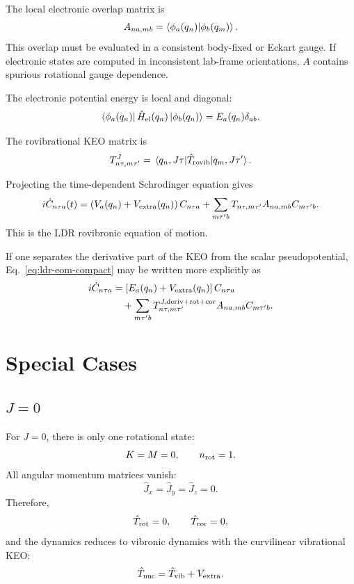 \documentclass[11pt]{revtex4-2}
\begin{document}
The local electronic overlap matrix is
\begin{equation}
  A_{n a, m b}
  =
  \braket{\phi_a(q_n)}{\phi_b(q_m)} .
  \label{eq:electronic-overlap}
\end{equation}
This overlap must be evaluated in a consistent body-fixed or Eckart gauge.
If electronic states are computed in inconsistent lab-frame orientations,
$A$ contains spurious rotational gauge dependence.

The electronic potential energy is local and diagonal:
\begin{equation}
  \bra{\phi_a(q_n)}
  \hat{H}_{\rm el}(q_n)
  \ket{\phi_b(q_n)}
  =
  E_a(q_n)\delta_{ab}.
\end{equation}

The rovibrational KEO matrix is
\begin{equation}
  T^J_{n\tau,m\tau'}
  =
  \mel{q_n,J\tau}
  {\hat{T}_{\rm rovib}}
  {q_m,J\tau'} .
  \label{eq:tj-matrix}
\end{equation}

Projecting the time-dependent Schrodinger equation gives
\begin{equation}
  i\dot{C}_{n\tau a}(t)
  =
  \left(V_a(q_n) + V_{\rm extra}(q_n)\right) C_{n\tau a}
  +
  \sum_{m\tau' b}
  T_{n\tau,m\tau'}
  A_{n a,mb}
  C_{m\tau' b}.
  \label{eq:ldr-eom-compact}
\end{equation}
This is the  LDR rovibronic equation of motion.

If one separates the derivative part of the KEO from the scalar
pseudopotential, Eq.~\eqref{eq:ldr-eom-compact} may be written more
explicitly as
\begin{align}
  i\dot{C}_{n\tau a}
  &=
  \left[
    E_a(q_n) + V_{\rm extra}(q_n)
  \right]
  C_{n\tau a}
  \nonumber\\
  &\quad+
  \sum_{m\tau' b}
  T^{J,{\rm deriv+rot+cor}}_{n\tau,m\tau'}
  A_{n a,m b}
  C_{m\tau' b}.
  \label{eq:ldr-eom-explicit}
\end{align}

\section{Special Cases}

\subsection{$J=0$}

For $J=0$, there is only one rotational state:
\begin{equation}
  K = M = 0,
  \qquad
  n_{\rm rot}=1.
\end{equation}
All angular momentum matrices vanish:
\begin{equation}
  \hat{J}_x = \hat{J}_y = \hat{J}_z = 0.
\end{equation}
Therefore,
\begin{equation}
  \hat{T}_{\rm rot}=0,
  \qquad
  \hat{T}_{\rm cor}=0,
\end{equation}
and the dynamics reduces to vibronic dynamics with the curvilinear
vibrational KEO:
\begin{equation}
  \hat{T}_{\rm nuc}
  =
  \hat{T}_{\rm vib}
  +
  V_{\rm extra}.
\end{equation}
\end{document}
